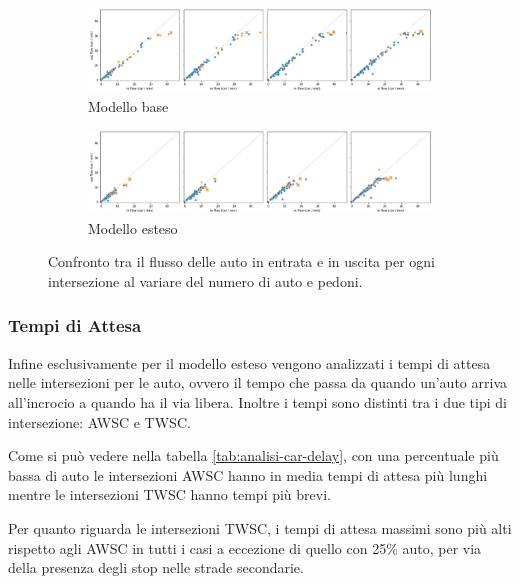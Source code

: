 \begin{figure}[p]
    \centering
    \begin{subfigure}{\textwidth}
        \centering
        \includegraphics[width=\textwidth]{images/analisi/comparison-base-in-out-flow-car.png}
        \caption{Modello base}
    \end{subfigure}

    \begin{subfigure}{\textwidth}
        \centering
        \includegraphics[width=\textwidth]{images/analisi/comparison-new-in-out-flow-car.png}
        \caption{Modello esteso}
    \end{subfigure}
    \caption{
        Confronto tra il flusso delle auto in entrata e in uscita per ogni intersezione al variare del numero di auto e pedoni.
    }
    \label{fig:analisi-comparison-in-out-flow-car}
\end{figure}


\subsubsection*{Tempi di Attesa}

Infine esclusivamente per il modello esteso vengono analizzati i tempi di attesa nelle intersezioni per le auto,
ovvero il tempo che passa da quando un'auto arriva all'incrocio a quando ha il via libera. 
Inoltre i tempi sono distinti tra i due tipi di intersezione: AWSC e TWSC.

Come si può vedere nella tabella \ref{tab:analisi-car-delay}, con una percentuale più bassa di auto le intersezioni AWSC 
hanno in media tempi di attesa più lunghi mentre le intersezioni TWSC hanno tempi più brevi.

Per quanto riguarda le intersezioni TWSC, i tempi di attesa massimi sono più alti rispetto agli AWSC in tutti i casi a eccezione di quello con 25\% auto, 
per via della presenza degli stop nelle strade secondarie.

